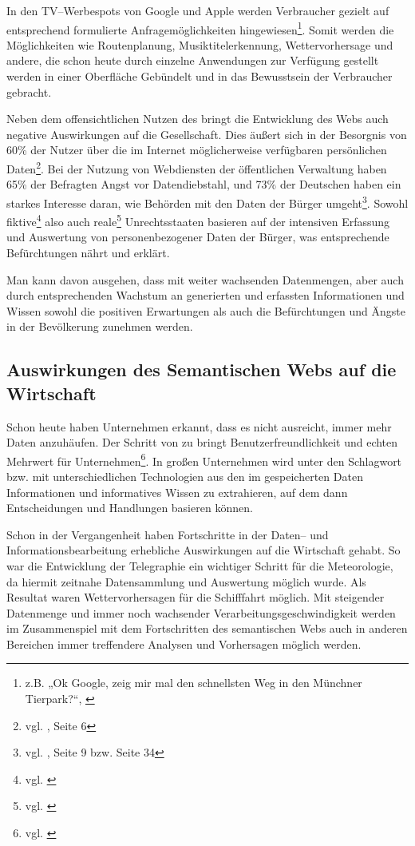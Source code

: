 In den TV--Werbespots von Google und Apple werden Verbraucher gezielt auf entsprechend formulierte Anfragemöglichkeiten hingewiesen\footnote{z.B. „Ok Google, zeig mir mal den schnellsten Weg in den Münchner Tierpark?“, \cite{okg:tierpark}}. Somit werden die Möglichkeiten wie Routenplanung, Musiktitelerkennung, Wettervorhersage und andere, die schon heute durch einzelne Anwendungen zur Verfügung gestellt werden in einer Oberfläche Gebündelt und in das Bewusstsein der Verbraucher gebracht.

\label{probleme}
Neben dem offensichtlichen Nutzen des  bringt die Entwicklung des Webs auch negative Auswirkungen auf die Gesellschaft. 
Dies äußert sich in der Besorgnis von 60\% der Nutzer über die im Internet möglicherweise verfügbaren persönlichen Daten\footnote{vgl. \cite{d21}, Seite 6}. Bei der Nutzung von Webdiensten der öffentlichen Verwaltung haben 65\% der Befragten Angst vor Datendiebstahl, und 73\% der Deutschen haben ein starkes Interesse daran, wie Behörden mit den Daten der Bürger umgeht\footnote{vgl. \cite{d21gov}, Seite 9 bzw. Seite 34}.  Sowohl fiktive\footnote{vgl. \cite{orwell}} also auch reale\footnote{vgl. \cite{wp:stasi}} Unrechtsstaaten basieren auf der intensiven Erfassung und Auswertung von personenbezogener Daten der Bürger, was entsprechende Befürchtungen nährt und erklärt.

Man kann davon ausgehen, dass mit weiter wachsenden Datenmengen, aber auch durch entsprechenden Wachstum an generierten und erfassten Informationen und Wissen sowohl die positiven Erwartungen als auch die Befürchtungen und Ängste in der Bevölkerung zunehmen werden.

\subsection{Auswirkungen des Semantischen Webs auf die Wirtschaft}

Schon heute haben Unternehmen erkannt, dass es nicht ausreicht, immer mehr Daten anzuhäufen. Der Schritt von  zu  bringt Benutzerfreundlichkeit und echten Mehrwert für Unternehmen\footnote{vgl. \cite{odnsbi}}. In großen Unternehmen wird unter den Schlagwort  bzw.  mit unterschiedlichen Technologien aus den im  gespeicherten Daten Informationen und informatives Wissen zu extrahieren, auf dem dann Entscheidungen und Handlungen basieren können. 

Schon in der Vergangenheit haben Fortschritte in der Daten-- und Informationsbearbeitung erhebliche Auswirkungen auf die Wirtschaft gehabt. So war die Entwicklung der Telegraphie ein wichtiger Schritt für die Meteorologie, da hiermit zeitnahe Datensammlung und Auswertung möglich wurde. Als Resultat waren Wettervorhersagen für die Schiff{}fahrt möglich. Mit steigender Datenmenge und immer noch wachsender Verarbeitungsgeschwindigkeit werden im Zusammenspiel mit dem Fortschritten des semantischen Webs auch in anderen Bereichen immer treffendere Analysen und Vorhersagen möglich werden. 

